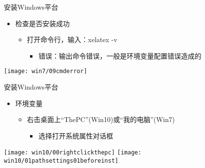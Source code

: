 \documentclass[fontset = none, t]{ctexbeamer}
\begin{document}
\begin{frame}{安装\tl}{Windows平台}
  \begin{spacing}{1.5}
    \begin{itemize}
    \item 检查\tl 是否安装成功
      \begin{itemize}
      \item 打开命令行，输入：xelatex -v
        \begin{itemize}
        \item 错误：输出\alert{命令错误}，一般是\alert{环境变量}配置错误造成的
        \end{itemize}
      \end{itemize}
    \end{itemize}
    \begin{center}
      \texttt{[image: win7/09cmderror]}
    \end{center}
  \end{spacing}         
\end{frame}

\begin{frame}{安装\tl}{Windows平台}
  \begin{spacing}{1.5}
    \begin{itemize}
    \item 环境变量
      \begin{itemize}
      \item 右击桌面上\enquote{ThePC}(Win10)或\enquote{我的电脑}(Win7)
        \begin{itemize}
        \item 选择打开系统属性对话框          
        \end{itemize}
      \end{itemize}
    \end{itemize}
    \begin{center}
      \texttt{[image: win10/00rightclickthepc]}
      \texttt{[image: win10/01pathsettings01beforeinst]}
    \end{center}
  \end{spacing}         
\end{frame}
\end{document}
